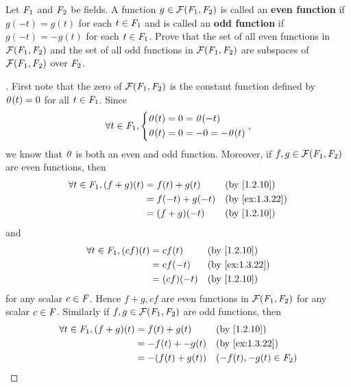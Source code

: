 \begin{ex}\label{ex:1.3.22}
  Let \(\mathit{F}_1\) and \(\mathit{F}_2\) be fields.
  A function \(g \in \fs{\F_1}{\F_2}\) is called an \textbf{even function} if \(g(-t) = g(t)\) for each \(t \in \mathit{F}_1\) and is called an \textbf{odd function} if \(g(-t) = -g(t)\) for each \(t \in \mathit{F}_1\).
  Prove that the set of all even functions in \(\fs{\F_1}{\F_2}\) and the set of all odd functions in \(\fs{\F_1}{\F_2}\) are subspaces of \(\fs{\F_1}{\F_2}\) over \(\mathit{F}_2\).
\end{ex}

\begin{proof}[]
  First note that the zero of \(\fs{\F_1}{\F_2}\) is the constant function defined by \(\mathit{0}(t) = 0\) for all \(t \in \mathit{F}_1\).
  Since
  \[
    \forall t \in \mathit{F}_1, \begin{dcases}
      \mathit{0}(t) = 0 = \mathit{0}(-t) \\
      \mathit{0}(t) = 0 = -0 = -\mathit{0}(t)
    \end{dcases},
  \]
  we know that \(\mathit{0}\) is both an even and odd function.
  Moreover, if \(f, g \in \fs{\F_1}{\F_2}\) are even functions, then
  \begin{align*}
    \forall t \in \F_1, (f + g)(t) & = f(t) + g(t)   &  & \text{(by \cref{1.2.10})}    \\
                                   & = f(-t) + g(-t) &  & \text{(by \cref{ex:1.3.22})} \\
                                   & = (f + g)(-t)   &  & \text{(by \cref{1.2.10})}
  \end{align*}
  and
  \begin{align*}
    \forall t \in \F_1, (cf)(t) & = cf(t)    &  & \text{(by \cref{1.2.10})}    \\
                                & = cf(-t)   &  & \text{(by \cref{ex:1.3.22})} \\
                                & = (cf)(-t) &  & \text{(by \cref{1.2.10})}
  \end{align*}
  for any scalar \(c \in \mathit{F}\).
  Hence \(f + g, cf\) are even functions in \(\fs{\F_1}{\F_2}\) for any scalar \(c \in \mathit{F}\).
  Similarly if \(f, g \in \fs{\F_1}{\F_2}\) are odd functions, then
  \begin{align*}
    \forall t \in \F_1, (f + g)(t) & = f(t) + g(t)    &  & \text{(by \cref{1.2.10})}    \\
                                   & = -f(t) + -g(t)  &  & \text{(by \cref{ex:1.3.22})} \\
                                   & = -(f(t) + g(t)) &  & (-f(t), -g(t) \in \F_2)      \\

\end{align*}
\end{proof}
